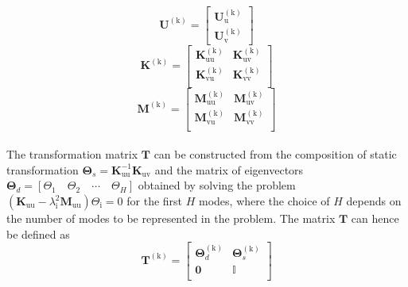 \begin{equation}
\bm U^{(\mathrm k)}=\left[
\begin{array}{c}
     {\bm U}^{(\mathrm k)}_{\mathrm{u}}  \\
     {\bm U}^{(\mathrm k)}_{\mathrm{v}}  
\end{array}\right]
\end{equation}
\begin{equation}
\mathbf K^{(\mathrm k)}=\left[
\begin{array}{cc}
  {\mathbf K}^{(\mathrm k)}_{\mathrm{uu}} &{\mathbf K}^{(\mathrm k)}_{\mathrm{uv}} \\
  {\mathbf K}^{(\mathrm k)}_{\mathrm{vu}} &{\mathbf K}^{(\mathrm k)}_{\mathrm{vv}} \\
\end{array}
\right]
\end{equation}
\begin{equation}
\mathbf M^{(\mathrm k)}=\left[
\begin{array}{cc}
  {\mathbf M}^{(\mathrm k)}_{\mathrm{uu}} &{\mathbf M}^{(\mathrm k)}_{\mathrm{uv}} \\
  {\mathbf M}^{(\mathrm k)}_{\mathrm{vu}} &{\mathbf M}^{(\mathrm k)}_{\mathrm{vv}} \\
\end{array}
\right]
\end{equation}
\\

The transformation matrix $\mathbf{T}$ can be constructed from the composition of static transformation $ {\bm\Theta}_s={\mathbf K}_{\mathrm{uu}}^{-1} {\mathbf K}_{\mathrm{uv}}$ and the matrix of eigenvectors $ {\bm \Theta}_d=[\Theta_1\quad\Theta_2\quad\cdots\quad\Theta_{H}] $ obtained by solving the problem $({\mathbf K}_{\mathrm{uu}}-\lambda_{\mathrm{i}}^2{\mathbf M}_{\mathrm{uu}})\Theta_{\mathrm{i}}=0$ for the first $H$ modes, where the choice of $H$ depends on the number of modes to be represented in the problem. The matrix $\mathbf{T}$ can hence be defined as\\

\begin{equation}
{\mathbf T}^{(\mathrm k)}=
\left[
\begin{array}{cc}
  {\bm \Theta}_d^{(\mathrm k)} &{\bm \Theta}_s^{(\mathrm k)} \\
  \bm 0 & \mathbb{I} \\
\end{array}
\right]
\end{equation}

